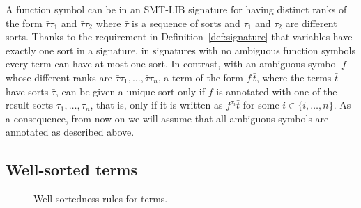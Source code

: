 
A function symbol can be 
in an SMT-LIB signature for having distinct ranks of the form
$\bar{\tau}\tau_1$ and $\bar{\tau}\tau_2$ 
where $\bar{\tau}$ is a sequence of sorts and 
$\tau_1$ and $\tau_2$ are different sorts.
Thanks to the requirement in Definition~\ref{def:signature} that
variables have exactly one sort in a signature,
in signatures with no ambiguous function symbols
every term can have at most one sort.
In contrast,
with an ambiguous symbol $f$ whose different ranks are
$\bar{\tau}\tau_1, \ldots, \bar{\tau}\tau_n$,
a term of the form $f\, \bar{t}$,
where the terms $\bar t$ have sorts $\bar \tau$, can be given 
a unique sort only if $f$ is annotated with one of the result sorts
$\tau_1, \ldots, \tau_n$,
that is, only if it is written as $f^{\tau_i}\bar{t}$ 
for some $i \in \{i,\ldots, n\}$.
As a consequence, from now on we will assume 
that all ambiguous symbols are annotated as described above.

\subsection{Well-sorted terms}
 
\begin{figure}
 \termrules
\caption{Well-sortedness rules for terms.}
\label{fig:well-sorted-terms}
\end{figure}

